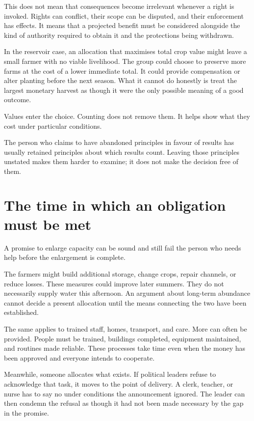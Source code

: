 \documentclass[12pt,a4paper]{book}
\begin{document}
This does not mean that consequences become irrelevant whenever a right is invoked. Rights can conflict, their scope can be disputed, and their enforcement has effects. It means that a projected benefit must be considered alongside the kind of authority required to obtain it and the protections being withdrawn.

In the reservoir case, an allocation that maximises total crop value might leave a small farmer with no viable livelihood. The group could choose to preserve more farms at the cost of a lower immediate total. It could provide compensation or alter planting before the next season. What it cannot do honestly is treat the largest monetary harvest as though it were the only possible meaning of a good outcome.

Values enter the choice. Counting does not remove them. It helps show what they cost under particular conditions.

The person who claims to have abandoned principles in favour of results has usually retained principles about which results count. Leaving those principles unstated makes them harder to examine; it does not make the decision free of them.

\section*{The time in which an obligation must be met}

A promise to enlarge capacity can be sound and still fail the person who needs help before the enlargement is complete.

The farmers might build additional storage, change crops, repair channels, or reduce losses. These measures could improve later summers. They do not necessarily supply water this afternoon. An argument about long-term abundance cannot decide a present allocation until the means connecting the two have been established.

The same applies to trained staff, homes, transport, and care. More can often be provided. People must be trained, buildings completed, equipment maintained, and routines made reliable. These processes take time even when the money has been approved and everyone intends to cooperate.

Meanwhile, someone allocates what exists. If political leaders refuse to acknowledge that task, it moves to the point of delivery. A clerk, teacher, or nurse has to say no under conditions the announcement ignored. The leader can then condemn the refusal as though it had not been made necessary by the gap in the promise.
\end{document}
